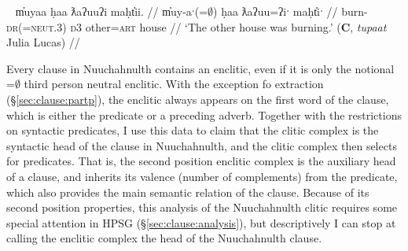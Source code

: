 \ex~ \label{ex:2padjpart}
\begingl
\glpreamble m̓uyaa ḥaa ƛaʔuuʔi maḥt̓ii. //
\gla m̓uy-aˑ(=$\emptyset$) ḥaa ƛaʔuu=ʔiˑ maḥt̓iˑ  //
\glb burn-\textsc{dr}(=\textsc{neut.3}) \textsc{d3} other=\textsc{art} house //
\glft `The other house was burning.' (\textbf{C}, \textit{tupaat} Julia Lucas) //
\endgl
\xe


Every clause in Nuuchahnulth contains an enclitic, even if it is only the notional =$\emptyset$ third person neutral enclitic. With the exception fo extraction (\S\ref{sec:clause:partp}), the enclitic always appears on the first word of the clause, which is either the predicate or a preceding adverb. Together with the restrictions on syntactic predicates, I use this data to claim that the clitic complex is the syntactic head of the clause in Nuuchahnulth, and the clitic complex then selects for predicates. That is, the second position enclitic complex is the auxiliary head of a clause, and inherits its valence (number of complements) from the predicate, which also provides the main semantic relation of the clause. Because of its second position properties, this analysis of the Nuuchahnulth clitic requires some special attention in HPSG (\S\ref{sec:clause:analysis}), but descriptively I can stop at calling the enclitic complex the head of the Nuuchahnulth clause.

